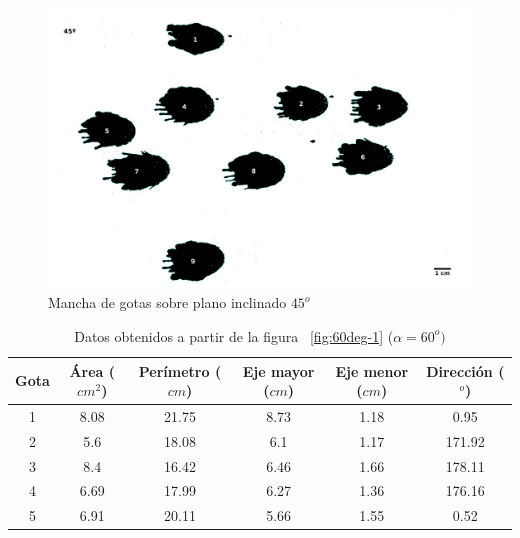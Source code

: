 \begin{figure}[H] \centering
\includegraphics[width=0.66\linewidth]{src/45_deg-1.png} \caption{Mancha de
gotas sobre plano inclinado $45^o$} \label{fig:45deg-1} \end{figure}

\pagebreak

\begin{table}[H] \centering \caption{Datos obtenidos a partir de la figura
    ~\ref{fig:60deg-1} ($\alpha=60^o)$} \label{tab:60deg-1}
    \begin{tabular}{cccccc} \toprule Gota & Área ($cm^2$) & Perímetro ($cm$) &
        Eje mayor ($cm$) & Eje menor ($cm$) & Dirección ($^o$) \\ \midrule 1 &
        8.08 & 21.75 & 8.73 & 1.18 & 0.95   \\ 2 & 5.6  & 18.08 & 6.1  & 1.17 &
        171.92 \\ 3 & 8.4  & 16.42 & 6.46 & 1.66 & 178.11 \\ 4 & 6.69 & 17.99 &
        6.27 & 1.36 & 176.16 \\ 5 & 6.91 & 20.11 & 5.66 & 1.55 & 0.52  \\
    \bottomrule \end{tabular} \end{table}

